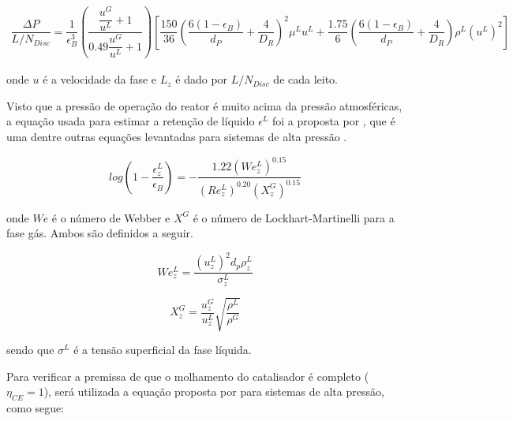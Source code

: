 \begin{equation}
\label{eq:deltaP}
\begin{split}
\dfrac{\Delta P }{L/N_{Disc}} = \dfrac{1}{\epsilon_B^{3}}
\left(\dfrac{\dfrac{u^{G}}{u^{L}} + 1}{0.49\dfrac{u^{G}}{u^{L}} + 1}\right)
\left[\dfrac{150}{36}\left(\dfrac{6(1-\epsilon_B)}{d_P}+\dfrac{4}{D_R}
\right)^2\mu^{L}u^{L} + \dfrac{1.75}{6} \left(\dfrac{6(1-\epsilon_B)}{d_P} +
\dfrac{4}{D_R}\right)\rho^{L}(u^{L})^2 \right]
\end{split}
\end{equation}


onde $u$ é a velocidade da fase e $L_z$ é dado por $L/N_{Disc}$ de cada leito.


Visto que a pressão de operação do reator é muito acima da pressão atmosféricas,
a equação usada para estimar a retenção de líquido $\epsilon^L$ foi a proposta
por , que é uma dentre outras
equações levantadas para sistemas de alta pressão \cite{Ancheyta2011}.

\begin{equation}
log \left (1-\dfrac{\epsilon_{z}^L}{\epsilon_B} \right) =
-\dfrac{1.22(We_{z}^L)^{0.15}}{(Re_{z}^L)^{0.20}(X_{z}^G)^{0.15}}
\label{eq:epsilonL}
\end{equation}

onde $We$ é o número de Webber e $X^G$ é o número de Lockhart-Martinelli
para a fase gás. Ambos são definidos a seguir.

\begin{equation}
We_{z}^L = \dfrac{(u_{z}^L)^2d_p\rho_{z}^L}{\sigma_{z}^L}
\label{eq:webber}
\end{equation}

\begin{equation}
X_{z}^G = \dfrac{u_{z}^G}{u_z^L} \sqrt{\dfrac{\rho^L}{\rho^G}}
\label{eq:X}
\end{equation}

sendo que $\sigma^L$ é a tensão superficial da fase líquida.


Para verificar a premissa de que o molhamento do catalisador é completo
($\eta_{CE} = 1$), será utilizada a equação proposta por
 para sistemas de alta pressão, como segue:

